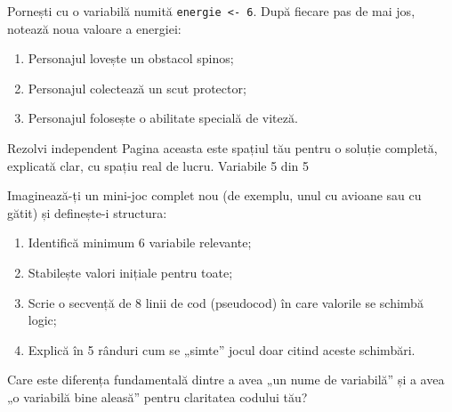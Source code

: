 \begin{semibox}
Pornești cu o variabilă numită \texttt{energie <- 6}. După fiecare pas de mai jos, notează noua valoare a energiei:
\begin{enumerate}
\item Personajul lovește un obstacol spinos;
\item Personajul colectează un scut protector;
\item Personajul folosește o abilitate specială de viteză.
\end{enumerate}
\end{semibox}

\clearpage

\PageHeader
  {Rezolvi independent}
  {Pagina aceasta este spațiul tău pentru o soluție completă, explicată clar, cu spațiu real de lucru.}
  {Variabile 5 din 5}

\begin{solobox}
Imaginează-ți un mini-joc complet nou (de exemplu, unul cu avioane sau cu gătit) și definește-i structura:
\begin{enumerate}
\item Identifică minimum 6 variabile relevante;
\item Stabilește valori inițiale pentru toate;
\item Scrie o secvență de 8 linii de cod (pseudocod) în care valorile se schimbă logic;
\item Explică în 5 rânduri cum se „simte” jocul doar citind aceste schimbări.
\end{enumerate}
\end{solobox}

\begin{solobox}
Care este diferența fundamentală dintre a avea „un nume de variabilă” și a avea „o variabilă bine aleasă” pentru claritatea codului tău?
\end{solobox}

\clearpage
